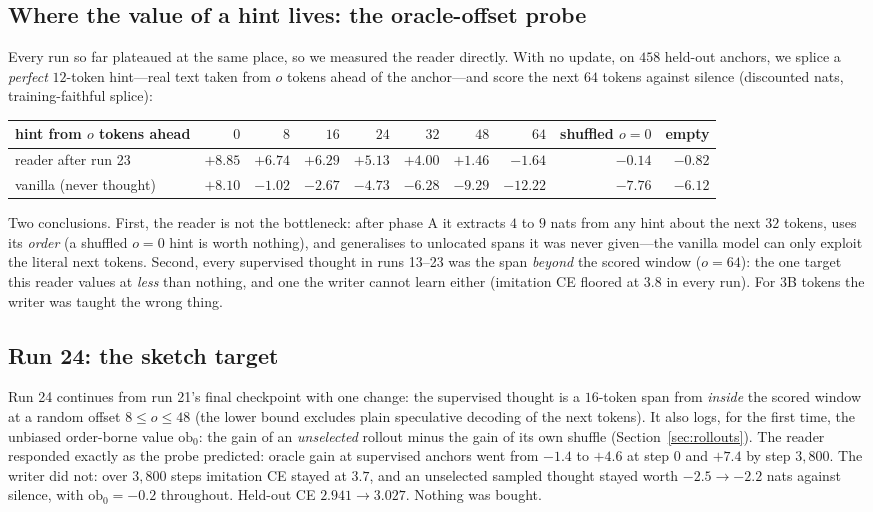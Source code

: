 \documentclass{article} %
\begin{document}
\subsection{Where the value of a hint lives: the oracle-offset probe}
\label{sec:offsetprobe}

Every run so far plateaued at the same place, so we measured the reader directly. With no update, on $458$ held-out anchors, we splice a \emph{perfect} $12$-token hint---real text taken from $o$ tokens ahead of the anchor---and score the next $64$ tokens against silence (discounted nats, training-faithful splice):
\begin{center}\small
\begin{tabular}{lrrrrrrrrr}
\toprule
hint from $o$ tokens ahead & $0$ & $8$ & $16$ & $24$ & $32$ & $48$ & $64$ & shuffled $o{=}0$ & empty \\
\midrule
reader after run 23 & $+8.85$ & $+6.74$ & $+6.29$ & $+5.13$ & $+4.00$ & $+1.46$ & $\mathbf{-1.64}$ & $-0.14$ & $-0.82$ \\
vanilla (never thought) & $+8.10$ & $-1.02$ & $-2.67$ & $-4.73$ & $-6.28$ & $-9.29$ & $-12.22$ & $-7.76$ & $-6.12$ \\
\bottomrule
\end{tabular}
\end{center}
Two conclusions. First, the reader is not the bottleneck: after phase A it extracts $4$ to $9$ nats from any hint about the next $32$ tokens, uses its \emph{order} (a shuffled $o{=}0$ hint is worth nothing), and generalises to unlocated spans it was never given---the vanilla model can only exploit the literal next tokens. Second, every supervised thought in runs 13--23 was the span \emph{beyond} the scored window ($o{=}64$): the one target this reader values at \emph{less} than nothing, and one the writer cannot learn either (imitation CE floored at $3.8$ in every run). For $3$B tokens the writer was taught the wrong thing.

\subsection{Run 24: the sketch target}
\label{sec:run24}

Run 24 continues from run 21's final checkpoint with one change: the supervised thought is a $16$-token span from \emph{inside} the scored window at a random offset $8 \le o \le 48$ (the lower bound excludes plain speculative decoding of the next tokens). It also logs, for the first time, the unbiased order-borne value $\mathrm{ob}_0$: the gain of an \emph{unselected} rollout minus the gain of its own shuffle (Section~\ref{sec:rollouts}). The reader responded exactly as the probe predicted: oracle gain at supervised anchors went from $-1.4$ to $+4.6$ at step $0$ and $+7.4$ by step $3{,}800$. The writer did not: over $3{,}800$ steps imitation CE stayed at $3.7$, and an unselected sampled thought stayed worth $-2.5 \to -2.2$ nats against silence, with $\mathrm{ob}_0 = -0.2$ throughout. Held-out CE $2.941 \to 3.027$. Nothing was bought.
\end{document}
